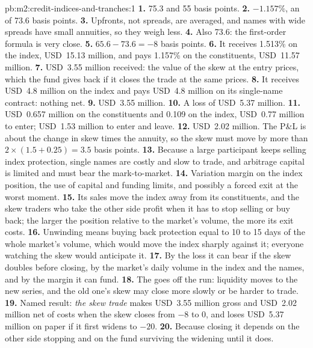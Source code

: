 \begin{solution}{pb:m2:credit-indices-and-tranches:1}
\textbf{1.} 75.3 and 55 basis points.
\textbf{2.} $-1.157\%$, an  of 73.6 basis points.
\textbf{3.} Upfronts, not spreads, are averaged, and names with wide spreads have small
annuities, so they weigh less.
\textbf{4.} Also 73.6: the first-order formula is very close.
\textbf{5.} $65.6 - 73.6 = -8$ basis points.
\textbf{6.} It receives 1.513\% on the index, USD~15.13 million, and pays 1.157\% on the
constituents, USD~11.57 million.
\textbf{7.} USD~3.55 million received: the value of the skew at the entry prices,
which the fund gives back if it closes the trade at the same prices.
\textbf{8.} It receives USD~4.8 million on the index and pays USD~4.8 million on its
single-name contract: nothing net.
\textbf{9.} USD~3.55 million.
\textbf{10.} A loss of USD~5.37 million.
\textbf{11.} USD~0.657 million on the constituents and 0.109 on the index, USD~0.77
million to enter; USD~1.53 million to enter and leave.
\textbf{12.} USD~2.02 million. The P\&L is about the change in skew times the annuity,
so the skew must move by more than $2 \times (1.5 + 0.25) = 3.5$ basis points.
\textbf{13.} Because a large participant keeps selling index protection, single names
are costly and slow to trade, and arbitrage capital is limited and must bear the
mark-to-market.
\textbf{14.} Variation margin on the index position, the use of capital and funding
limits, and possibly a forced exit at the worst moment.
\textbf{15.} Its sales move the index away from its constituents, and the skew traders
who take the other side profit when it has to stop selling or buy back; the larger the
position relative to the market's volume, the more its exit costs.
\textbf{16.} Unwinding means buying back protection equal to 10 to 15 days of the whole
market's volume, which would move the index sharply against it; everyone watching
the skew would anticipate it.
\textbf{17.} By the loss it can bear if the skew doubles before closing, by the
market's daily volume in the index and the names, and by the margin it can fund.
\textbf{18.} The  goes off the run: liquidity moves to the new series, and
the old one's skew may close more slowly or be harder to trade.
\textbf{19.} Named result: \emph{the skew trade} makes USD~3.55 million gross and
USD~2.02 million net of costs when the skew closes from $-8$ to 0, and loses USD~5.37
million on paper if it first widens to $-20$.
\textbf{20.} Because closing it depends on the other side stopping and on the fund
surviving the widening until it does.
\end{solution}


